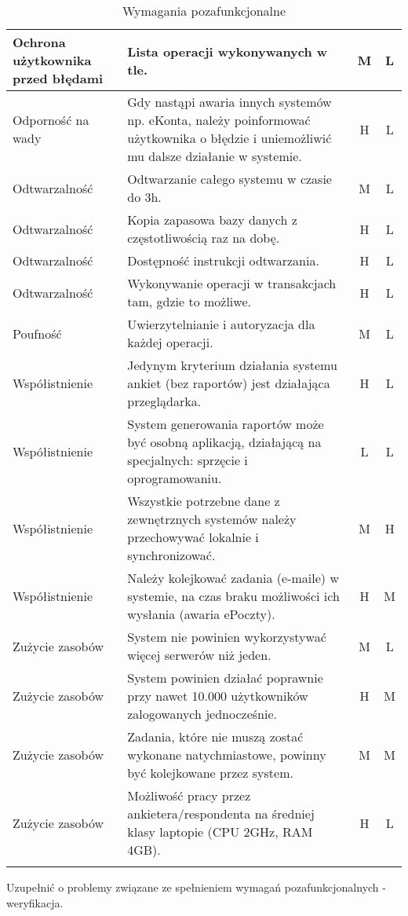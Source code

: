 \begin{center}
\begin{longtable}{ | p{4cm} | p{9cm} | c | c | }
Ochrona użytkownika przed błędami & Lista operacji wykonywanych w tle. & M & L \\ \hline
%
Odporność na wady & Gdy nastąpi awaria innych systemów np. eKonta, należy poinformować użytkownika o błędzie i uniemożliwić mu dalsze działanie w systemie. & H & L \\ \hline
%
Odtwarzalność & Odtwarzanie całego systemu w czasie do 3h. & M & L \\ \hline
Odtwarzalność & Kopia zapasowa bazy danych z częstotliwością raz na dobę. & H & L \\ \hline
Odtwarzalność & Dostępność instrukcji odtwarzania. & H & L \\ \hline
Odtwarzalność & Wykonywanie operacji w transakcjach tam, gdzie to możliwe. & H & L \\ \hline
%
Poufność & Uwierzytelnianie i autoryzacja dla każdej operacji. & M & L \\ \hline
%
Współistnienie & Jedynym kryterium działania systemu ankiet (bez raportów) jest działająca przeglądarka. & H & L \\ \hline
Współistnienie & System generowania raportów może być osobną aplikacją, działającą na specjalnych: sprzęcie i oprogramowaniu. & L & L \\ \hline
Współistnienie & Wszystkie potrzebne dane z zewnętrznych systemów należy przechowywać lokalnie i synchronizować. & M & H \\ \hline
Współistnienie & Należy kolejkować zadania (e-maile) w systemie, na czas braku możliwości ich wysłania (awaria ePoczty). & H & M \\ \hline
%
Zużycie zasobów & System nie powinien wykorzystywać więcej serwerów niż jeden. & M & L \\ \hline
Zużycie zasobów & System powinien działać poprawnie przy nawet 10.000 użytkowników zalogowanych jednocześnie. & H & M \\ \hline
Zużycie zasobów & Zadania, które nie muszą zostać wykonane natychmiastowe, powinny być kolejkowane przez system. & M & M \\ \hline
Zużycie zasobów & Możliwość pracy przez ankietera\slash respondenta na średniej klasy laptopie (CPU 2GHz, RAM 4GB). & H & L \\ \hline
%
\caption{Wymagania pozafunkcjonalne}\label{tab:reqs}
\end{longtable}
\end{center}

{\color{red}Uzupełnić o problemy związane ze spełnieniem wymagań pozafunkcjonalnych - weryfikacja.}
